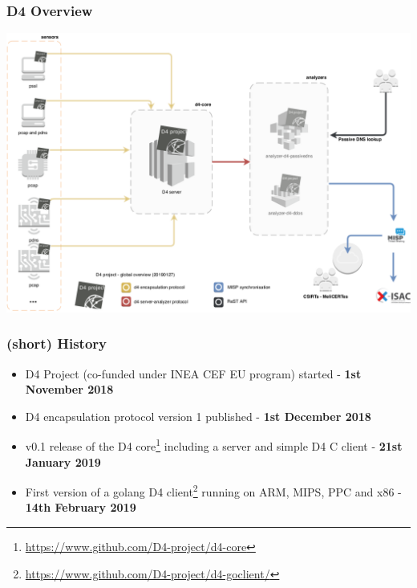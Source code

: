 \documentclass{beamer}
\begin{document}
\begin{frame}
\frametitle{D4 Overview}
        \includegraphics[scale=0.38]{../../diagram/d4-overview.png}
\end{frame}


\begin{frame}
        \frametitle{(short) History}
 \begin{itemize}
        \item D4 Project (co-funded under INEA CEF EU program) started - {\bf 1st November 2018}
        \item D4 encapsulation protocol version 1 published  - {\bf 1st December 2018}
        \item v0.1 release of the D4 core\footnote{\url{https://www.github.com/D4-project/d4-core}} including a server and simple D4 C client - {\bf 21st January 2019}
        \item First version of a golang D4
          client\footnote{\url{https://www.github.com/D4-project/d4-goclient/}}
          running on ARM, MIPS, PPC and x86 - {\bf 14th February 2019}
 \end{itemize}
\end{frame}
\end{document}
